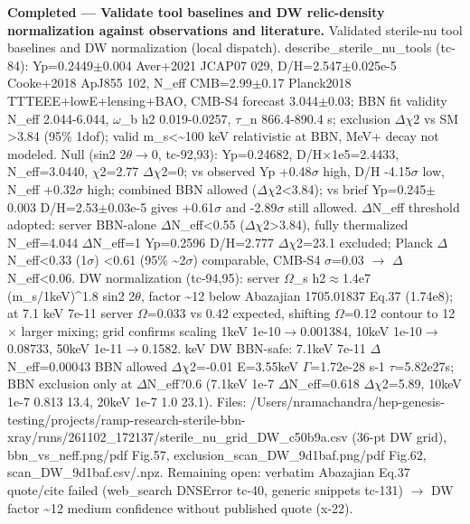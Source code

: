 \documentclass[11pt,a4paper]{article}
\begin{document}
\textbf{Completed --- Validate tool baselines and DW relic-density normalization against observations and literature.} Validated sterile-nu tool baselines and DW normalization (local dispatch). describe\_sterile\_nu\_tools (tc-84): Yp=0.2449$\pm$0.004 Aver+2021 JCAP07 029, D/H=2.547$\pm$0.025e-5 Cooke+2018 ApJ855 102, N\_eff CMB=2.99$\pm$0.17 Planck2018 TTTEEE+lowE+lensing+BAO, CMB-S4 forecast 3.044$\pm$0.03; BBN fit validity N\_eff 2.044-6.044, $\omega$\_b h2 0.019-0.0257, $\tau$\_n 866.4-890.4 s; exclusion $\Delta$$\chi$2 vs SM \textgreater{}3.84 (95\% 1dof); valid m\_s\textless{}\textasciitilde{}100 keV relativistic at BBN, MeV+ decay not modeled. Null (sin2 2$\theta$$\to$0, tc-92,93): Yp=0.24682, D/H$\times$1e5=2.4433, N\_eff=3.0440, $\chi$2=2.77 $\Delta$$\chi$2=0; vs observed Yp +0.48$\sigma$ high, D/H -4.15$\sigma$ low, N\_eff +0.32$\sigma$ high; combined BBN allowed ($\Delta$$\chi$2\textless{}3.84); vs brief Yp=0.245$\pm$0.003 D/H=2.53$\pm$0.03e-5 gives +0.61$\sigma$ and -2.89$\sigma$ still allowed. $\Delta$N\_eff threshold adopted: server BBN-alone $\Delta$N\_eff\textless{}0.55 ($\Delta$$\chi$2\textgreater{}3.84), fully thermalized N\_eff=4.044 $\Delta$N\_eff=1 Yp=0.2596 D/H=2.777 $\Delta$$\chi$2=23.1 excluded; Planck $\Delta$N\_eff\textless{}0.33 (1$\sigma$) \textless{}0.61 (95\% \textasciitilde{}2$\sigma$) comparable, CMB-S4 $\sigma$=0.03 $\to$ $\Delta$N\_eff\textless{}0.06. DW normalization (tc-94,95): server $\Omega$\_s h2$\approx$1.4e7 (m\_s/1keV)\textasciicircum{}1.8 sin2 2$\theta$, factor \textasciitilde{}12 below Abazajian 1705.01837 Eq.37 (1.74e8); at 7.1 keV 7e-11 server $\Omega$=0.033 vs 0.42 expected, shifting $\Omega$=0.12 contour to 12$\times$ larger mixing; grid confirms scaling 1keV 1e-10$\to$0.001384, 10keV 1e-10$\to$0.08733, 50keV 1e-11$\to$0.1582. keV DW BBN-safe: 7.1keV 7e-11 $\Delta$N\_eff=0.00043 BBN allowed $\Delta$$\chi$2=-0.01 E=3.55keV $\Gamma$=1.72e-28 s-1 $\tau$=5.82e27s; BBN exclusion only at $\Delta$N\_eff?0.6 (7.1keV 1e-7 $\Delta$N\_eff=0.618 $\Delta$$\chi$2=5.89, 10keV 1e-7 0.813 13.4, 20keV 1e-7 1.0 23.1). Files: /Users/nramachandra/hep-genesis-testing/projects/ramp-research-sterile-bbn-xray/runs/261102\_172137/sterile\_nu\_grid\_DW\_c50b9a.csv (36-pt DW grid), bbn\_vs\_neff.png/pdf Fig.57, exclusion\_scan\_DW\_9d1baf.png/pdf Fig.62, scan\_DW\_9d1baf.csv/.npz. Remaining open: verbatim Abazajian Eq.37 quote/cite failed (web\_search DNSError tc-40, generic snippets tc-131) $\to$ DW factor \textasciitilde{}12 medium confidence without published quote (x-22).
\end{document}
